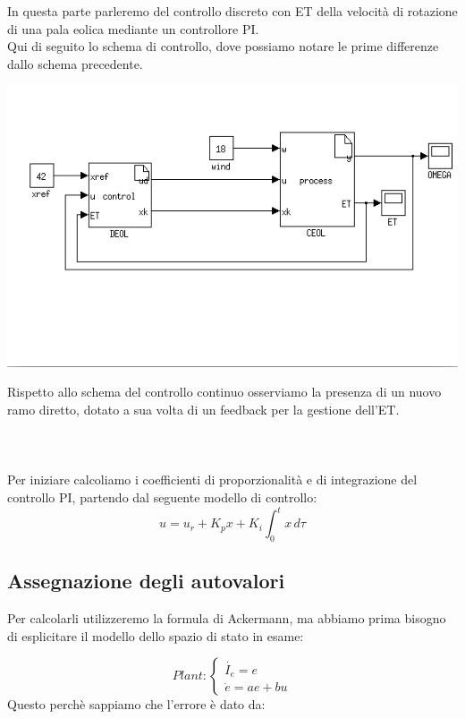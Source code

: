 \documentclass[a4paper,13pt]{article}
\begin{document}
	In questa parte parleremo del controllo discreto con ET della velocità di rotazione di una pala eolica mediante un
	controllore PI.\\ Qui di seguito lo schema di controllo, dove possiamo notare le prime differenze dallo schema 				precedente.
	
\begin{center}
\includegraphics[scale=0.6]{eoltrig.png}
\end{center}

	Rispetto allo schema del controllo continuo osserviamo la presenza di un nuovo ramo diretto, dotato a sua volta di un
	feedback per la gestione dell'ET.\\ \\ \\ \\
	Per iniziare calcoliamo i coefficienti di proporzionalità e di integrazione del controllo PI, partendo dal seguente 		modello di controllo:\\
\begin{equation*}
	u=u_{r}+K_{p}x+K_{i}\int_{0}^{t} x \, d\tau              %
\end{equation*}	
\subsection{Assegnazione degli autovalori}

	Per calcolarli utilizzeremo la formula di Ackermann, ma abbiamo prima bisogno di esplicitare il modello dello spazio 		di
	stato in esame:

\[Plant	:
\begin{cases}
	
	\dot{I_{e}}= e \\
	\dot{e} = ae + bu
	
\end{cases}\]
	Questo perchè sappiamo che l'errore è dato da:
\end{document}
